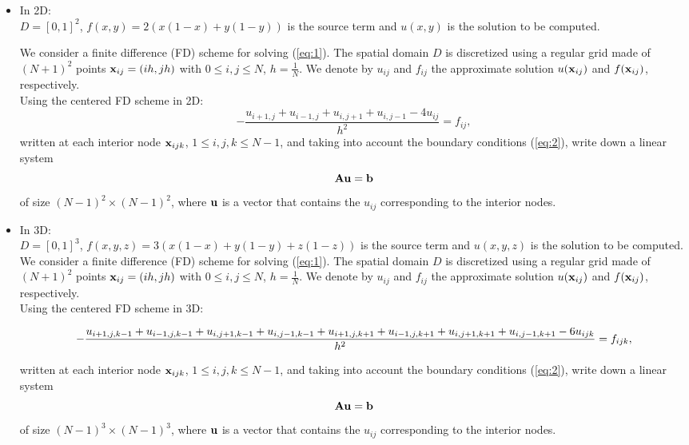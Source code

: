 \begin{itemize}

\item In 2D:\\
$D=[0,1]^2$,   $f(x,y)=2(x(1-x)+y(1-y))$ is the source term and $u(x,y)$ is the solution to be computed.\par
We consider a finite difference (FD) scheme for solving (\ref{eq:1}). The spatial domain $D$ is discretized using a regular grid made of $(N+1)^2$ points $\mathbf{x}_{ij}=(ih,jh)$ with $0\leq i,j \leq N$, $h=\frac{1}{N}$. We denote by $u_{ij}$ and $f_{ij}$ the approximate solution $u(\mathbf{x}_{ij})$ and $f(\mathbf{x}_{ij})$, respectively.\\
Using the centered FD scheme in 2D:
$$
-\frac{u_{i+1,j}+u_{i-1,j}+u_{i,j+1}+u_{i,j-1}-4 u_{ij}}{h^2}=f_{ij},
$$
written at each interior node $\mathbf{x}_{ijk}$, $1 \leq i,j,k \leq N-1$, and taking into account the boundary conditions (\ref{eq:2}), write down a linear system \begin{equation}\label{eq:linsyst} \mathbf{A} \mathbf{u} = \mathbf{b}
\end{equation} of size $(N-1)^2\times (N-1)^2$, where $\mathbf{u}$ is a vector that contains the $u_{ij}$ corresponding to the interior nodes.

\item In 3D: \\
$D=[0,1]^3$, $f(x,y,z)=3(x(1-x)+y(1-y)+z(1-z))$ is the source term and $u(x,y,z)$ is the solution to be computed. We consider a finite difference (FD) scheme for solving (\ref{eq:1}). The spatial domain $D$ is discretized using a regular grid made of $(N+1)^2$ points $\mathbf{x}_{ij}=(ih,jh)$ with $0\leq i,j \leq N$, $h=\frac{1}{N}$. We denote by $u_{ij}$ and $f_{ij}$ the approximate solution $u(\mathbf{x}_{ij})$ and $f(\mathbf{x}_{ij})$, respectively. \\
Using the centered FD scheme in 3D:

$$
\small{-\frac{u_{i+1,j,k-1}+u_{i-1,j,k-1}+u_{i,j+1,k-1}+u_{i,j-1,k-1} + u_{i+1,j,k+1}+u_{i-1,j,k+1}+u_{i,j+1,k+1}+u_{i,j-1,k+1}-6 u_{ijk}}{h^2}=f_{ijk},}
$$

written at each interior node $\mathbf{x}_{ijk}$, $1 \leq i,j,k \leq N-1$, and taking into account the boundary conditions (\ref{eq:2}), write down a linear system \begin{equation}\label{eq:linsyst} \mathbf{A} \mathbf{u} = \mathbf{b}
\end{equation} of size $(N-1)^3\times (N-1)^3$, where $\mathbf{u}$ is a vector that contains the $u_{ij}$ corresponding to the interior nodes.

\end{itemize}

